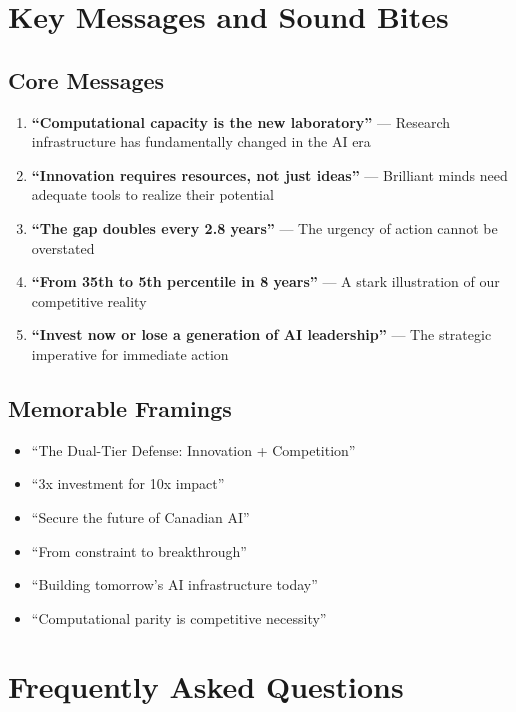 \documentclass{article}
\begin{document}
\section{Key Messages and Sound Bites}

\subsection{Core Messages}

\begin{enumerate}
\item \textbf{``Computational capacity is the new laboratory''} --- Research infrastructure has fundamentally changed in the AI era

\item \textbf{``Innovation requires resources, not just ideas''} --- Brilliant minds need adequate tools to realize their potential

\item \textbf{``The gap doubles every 2.8 years''} --- The urgency of action cannot be overstated

\item \textbf{``From 35th to 5th percentile in 8 years''} --- A stark illustration of our competitive reality

\item \textbf{``Invest now or lose a generation of AI leadership''} --- The strategic imperative for immediate action
\end{enumerate}

\subsection{Memorable Framings}

\begin{itemize}
\item ``The Dual-Tier Defense: Innovation + Competition''
\item ``3x investment for 10x impact''
\item ``Secure the future of Canadian AI''
\item ``From constraint to breakthrough''
\item ``Building tomorrow's AI infrastructure today''
\item ``Computational parity is competitive necessity''
\end{itemize}

\section{Frequently Asked Questions}
\end{document}
